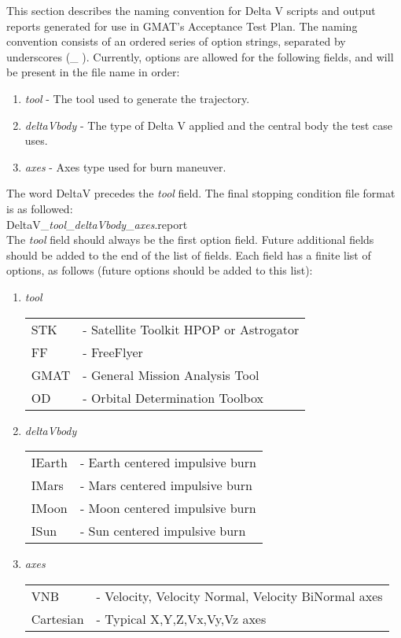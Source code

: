 This section describes the naming convention for Delta V scripts and
output reports generated for use in GMAT's Acceptance Test Plan. The
naming convention consists of an ordered series of option strings,
separated by underscores (\_ ). Currently, options are allowed for
the following fields, and will be present in the file name in order:
\begin{enumerate}
  \item \emph{tool} - The tool used to generate the trajectory.
  \item \emph{deltaVbody} - The type of Delta V applied and the
  central body the test case uses.
  \item \emph{axes} - Axes type used for burn maneuver.
\end{enumerate}

The word DeltaV precedes the \emph{tool} field. The final
stopping condition file format is as followed:\\
DeltaV\_\emph{tool}\_\emph{deltaVbody}\_\emph{axes}.report\\

The \emph{tool} field should always be the first option field.
Future additional fields should be added to the end of the list of
fields. Each field has a finite list of options, as follows (future
options should be added to this list):
\begin{enumerate}
  \item \emph{tool}
  \begin{tabular}{ll}
    STK  & - Satellite Toolkit HPOP or Astrogator\\
    FF   & - FreeFlyer\\
    GMAT & - General Mission Analysis Tool\\
    OD   & - Orbital Determination Toolbox\\
  \end{tabular}

  \item \emph{deltaVbody}
  \begin{tabular}{ll}
    IEarth & - Earth centered impulsive burn\\
    IMars  & - Mars centered impulsive burn\\
    IMoon  & - Moon centered impulsive burn\\
    ISun  & - Sun centered impulsive burn\\
  \end{tabular}

  \item \emph{axes}
  \begin{tabular}{ll}
    VNB   & - Velocity, Velocity Normal, Velocity BiNormal axes\\
    Cartesian & - Typical X,Y,Z,Vx,Vy,Vz axes\\
  \end{tabular}
\end{enumerate}
